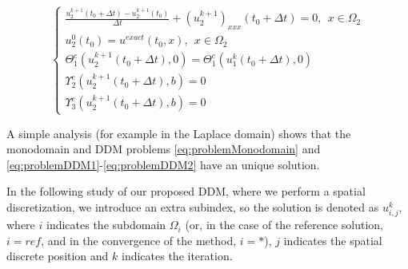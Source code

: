 \begin{equation}
    \label{eq:problemDDM2}
    \begin{cases}
        \frac{u_2^{k+1}(t_0+\Delta t) - u_2^{k+1}(t_0)}{\Delta t} + (u_2^{k+1})_{xxx}(t_0+\Delta t) = 0 , \ \ x \in \Omega_2\\
        u_2^{0}(t_0) = u^{exact}(t_0,x) , \ \ x \in \Omega_2 \\
        \Theta_1^{c}(u_2^{k+1}(t_0+\Delta t),0) = \Theta_1^{c}(u_1^{k}(t_0+\Delta t),0) \\
        \Upsilon_2^{c}(u_2^{k+1}(t_0+\Delta t),b) = 0 \\
        \Upsilon_3^{c}(u_2^{k+1}(t_0+\Delta t),b) = 0
     \end{cases}
\end{equation}
%

\indent A simple analysis (for example in the Laplace domain) shows that the monodomain and DDM problems \eqref{eq:problemMonodomain} and \eqref{eq:problemDDM1}-\eqref{eq:problemDDM2} have an unique solution.

\indent {}


\begin{remark} In the following study of our proposed DDM, where we perform a spatial discretization, we introduce an extra subindex, so the solution is denoted as $u_{i,j}^{k}$, where $i$ indicates the subdomain $\Omega_i$ (or, in the case of the reference solution, $i = ref$, and in the convergence of the method, $i = *$), $j$ indicates the spatial discrete position and $k$ indicates the iteration.\end{remark}


